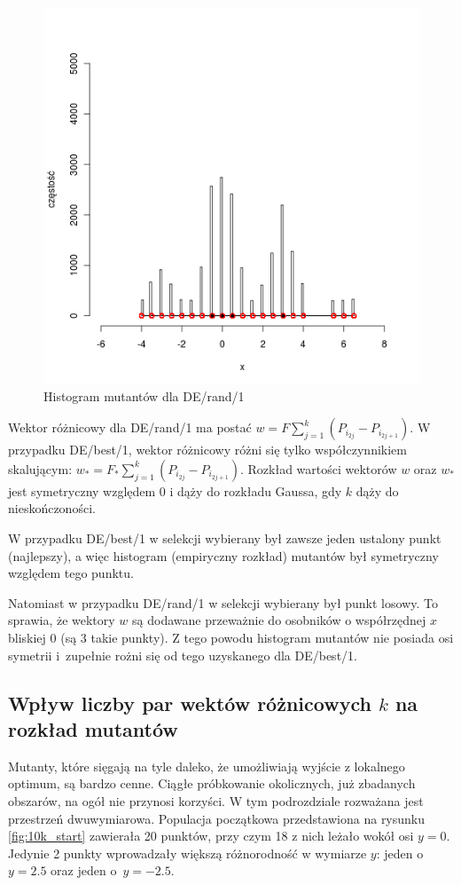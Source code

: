 \documentclass[a4paper,onecolumn,oneside,12pt,wide,floatssmall]{mwrep}
\theoremstyle{definition}
\theoremstyle{plain}%
\theoremstyle{remark}
\begin{document}
\begin{figure}[H]
\centering
\includegraphics[width=.65\textwidth]{img/rand}
\caption{Histogram mutantów dla DE/rand/1} 
\label{fig:sym_rand}
\end{figure}

Wektor różnicowy dla DE/rand/1 ma postać $w = F\sum\limits_{j=1}^k (P_{i_{2j}} - P_{i_{2j+1}})$. 
W przypadku DE/best/1, wektor różnicowy różni się tylko współczynnikiem skalującym:
$w_* = F_*\sum\limits_{j=1}^k (P_{i_{2j}} - P_{i_{2j+1}})$.
Rozkład wartości wektorów $w$ oraz $w_*$ jest symetryczny względem 0 i dąży do rozkładu Gaussa, gdy $k$ dąży do 
nieskończoności.

W przypadku DE/best/1 w selekcji wybierany był zawsze jeden ustalony punkt (najlepszy), 
a więc histogram (empiryczny rozkład) mutantów był symetryczny względem tego punktu.

Natomiast w przypadku DE/rand/1
w selekcji wybierany był punkt losowy. To sprawia, że wektory $w$ są dodawane
przeważnie do osobników o współrzędnej $x$ bliskiej 0 (są 3 takie punkty).
Z tego powodu histogram mutantów nie posiada osi symetrii i~zupełnie rożni się od tego uzyskanego dla DE/best/1.

\subsection{Wpływ liczby par wektów różnicowych $k$ na rozkład mutantów}

Mutanty, które sięgają
na tyle daleko, że umożliwiają wyjście z lokalnego optimum, są bardzo cenne. 
Ciągłe próbkowanie okolicznych, już zbadanych obszarów, na ogół nie przynosi korzyści.
W tym podrozdziale rozważana jest przestrzeń dwuwymiarowa.
Populacja początkowa przedstawiona na rysunku \ref{fig:10k_start} zawierała 20 punktów, 
przy czym 18 z nich leżało wokół osi $y = 0$. 
Jedynie 2 punkty wprowadzały większą różnorodność 
w wymiarze $y$: jeden o $y = 2.5$ oraz jeden o~$y = -2.5$. 
\end{document}
